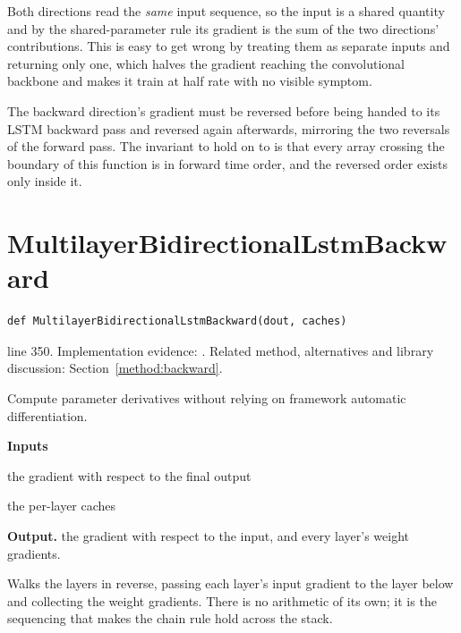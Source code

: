 Both directions read the \emph{same} input sequence, so the input is a shared quantity and by the shared-parameter rule its gradient is the sum of the two directions' contributions. This is easy to get wrong by treating them as separate inputs and returning only one, which halves the gradient reaching the convolutional backbone and makes it train at half rate with no visible symptom.


The backward direction's gradient must be reversed before being handed to its LSTM backward pass and reversed again afterwards, mirroring the two reversals of the forward pass. The invariant to hold on to is that every array crossing the boundary of this function is in forward time order, and the reversed order exists only inside it.



\section{MultilayerBidirectionalLstmBackward}\label{fn:train:MultilayerBidirectionalLstmBackward}
\begin{lstlisting}[style=sig]
def MultilayerBidirectionalLstmBackward(dout, caches)
\end{lstlisting}
 line 350. Implementation evidence: \cite{code2026}. Related method, alternatives and library discussion: Section~\ref{method:backward}.


Compute parameter derivatives without relying on framework automatic differentiation.




\noindent\textbf{Inputs}
\begin{description}[leftmargin=2.2em,style=nextline,font=\normalfont\ttfamily]\setlength\itemsep{1pt}
  \item[{dout}] \normalfont the gradient with respect to the final output
  \item[{caches}] \normalfont the per-layer caches
\end{description}

\noindent\textbf{Output.} the gradient with respect to the input, and every layer's weight gradients.


Walks the layers in reverse, passing each layer's input gradient to the layer below and collecting the weight gradients. There is no arithmetic of its own; it is the sequencing that makes the chain rule hold across the stack.



